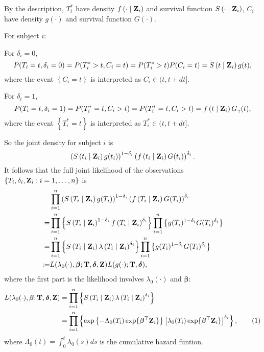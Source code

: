 \documentclass[11pt]{article}
\newcommand{\numit}{\stepcounter{equation}\tag{\theequation}}
\newcommand{\cS}[1]{S \left( #1 \mid \bZ_i \right)}
\newcommand{\cf}[1]{f \left( #1 \mid \bZ_i \right)}
\newcommand{\clamb}[1]{\lambda \left( #1 \mid \bZ_i \right)}
\newcommand{\bT}{{\bf{T}}}
\newcommand{\bZ}{{\bf{Z}}}
\newcommand{\bdelta}{{\bm \delta}}
\newcommand{\bbeta}{{\bm \beta}}
\begin{document}
By the description, $T_i^{*}$ have density $\cf{\cdot}$ and survival function $\cS{\cdot}$, $C_i$
have density $g(\cdot)$ and survival function $G(\cdot)$.

For subject $i$:

For $\delta_i=0$,
\begin{equation*}
P(T_i=t,\delta_i=0) = P(T_i^{*}>t, C_i=t)=P(T_i^{*}>t)P(C_i=t) = \cS{t}g(t),
\end{equation*}
where the event $\left\{ C_i=t \right\}$ is interpreted as $C_i\in (t,t+dt]$.

For $\delta_i=1$,
\begin{equation*}
P(T_i=t, \delta_i=1) = P(T_i^{*}=t, C_i>t) = P(T_i^{*}=t, C_i>t) = \cf{t}G_{\gamma}(t),
\end{equation*}
where the event $\left\{ T_i^{*}=t \right\}$ is interpreted as $T_i^{*}\in (t,t+dt]$.

So the joint density for subject $i$ is
\begin{equation*}
\left( \cS{t_i}g(t_i) \right)^{1-\delta_i}\left( \cf{t_i}G(t_i) \right)^{\delta_i}.
\end{equation*}
It follows that the full joint likelihood of the observations
$\{T_i,\delta_i,\bZ_i:i=1,\dots,n\}$ is
\begin{align*}
   &\prod_{i=1}^n \left( \cS{T_i}g(T_i) \right)^{1-\delta_i}\left( \cf{T_i}G(T_i) \right)^{\delta_i}\\
  =& \prod_{i=1}^n \left\{ \cS{T_i}^{1-\delta_i}\cf{T_i}^{\delta_i} \right\} \prod_{i=1}^n \left\{ g(T_i)^{1-\delta_i} G(T_i)^{\delta_i} \right\}\\
  =& \prod_{i=1}^n \left\{ \cS{T_i}\clamb{T_i}^{\delta_i} \right\} \prod_{i=1}^n \left\{ g(T_i)^{1-\delta_i} G(T_i)^{\delta_i} \right\}\\
  :=& L(\lambda_0(\cdot),\bbeta;\bT,\bdelta,\bZ) L(g(\cdot);\bT,\bdelta),
\end{align*}
where the first part is the likelihood involves $\lambda_0(\cdot)$ and $\bbeta$:
\begin{align*}
L(\lambda_0(\cdot),\bbeta;\bT,\bdelta,\bZ) &= \prod_{i=1}^n \left\{ \cS{T_i}\clamb{T_i}^{\delta_i} \right\}\\
  &= \prod_{i=1}^n \left\{\exp \left\{ -\Lambda_0(T_i) \exp\{\bbeta^{\top}\bZ_i\} \right\} \left[ \lambda_0(T_i)\exp\{\bbeta^{\top}\bZ_i\} \right]^{\delta_i} \right\},
  \numit\label{eq:Lik1}
\end{align*}
where $\Lambda_0(t) = \int_0^t\lambda_0(s)ds$ is the cumulative hazard funtion.
\end{document}
